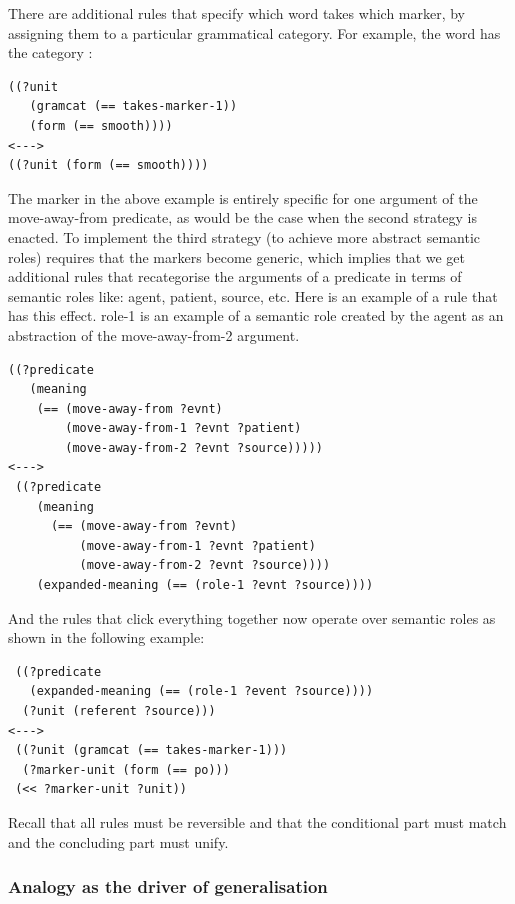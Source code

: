 There are additional rules that specify which word takes which marker, by assigning them to a particular 
grammatical category. For example, the word  has the category : 
\begin{verbatim}
((?unit
   (gramcat (== takes-marker-1)) 
   (form (== smooth))))
<---> 
((?unit (form (== smooth))))
\end{verbatim}

The marker  in the above example is entirely specific for one argument of the move-away-from predicate, as would be the 
case when the second strategy is enacted. To implement the third strategy 
(to achieve more abstract semantic roles) requires that the markers become generic, which implies that 
we get additional rules that recategorise the arguments of a predicate in terms of 
semantic roles like: agent, patient, source, etc. Here is an example of a rule that 
has this effect. role-1 is an example of a semantic role created by the agent as an abstraction of the 
move-away-from-2 argument. 
\begin{verbatim}
((?predicate
   (meaning
    (== (move-away-from ?evnt) 
        (move-away-from-1 ?evnt ?patient)
        (move-away-from-2 ?evnt ?source)))))
<---> 
 ((?predicate
    (meaning
      (== (move-away-from ?evnt)
          (move-away-from-1 ?evnt ?patient)
          (move-away-from-2 ?evnt ?source)))) 
    (expanded-meaning (== (role-1 ?evnt ?source))))
\end{verbatim}
And the rules that click everything together now operate over semantic roles as shown in the following example: 
\begin{verbatim}
 ((?predicate
   (expanded-meaning (== (role-1 ?event ?source))))
  (?unit (referent ?source))) 
<---> 
 ((?unit (gramcat (== takes-marker-1)))
  (?marker-unit (form (== po))) 
 (<< ?marker-unit ?unit))
\end{verbatim}
Recall that all rules must be reversible and that the conditional part must match and the concluding part must unify.

\subsubsection{Analogy as the driver of generalisation}

